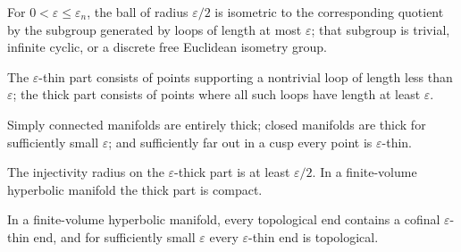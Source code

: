 \begin{theorem}
\label{thm:chow-iv-margulis-local}

For \(0<\varepsilon\le\varepsilon_n\), the ball of radius \(\varepsilon/2\) is
isometric to the corresponding quotient by the subgroup generated by loops of
length at most \(\varepsilon\); that subgroup is trivial, infinite cyclic, or
a discrete free Euclidean isometry group.
\end{theorem}

\begin{definition}
\label{def:chow-iv-thick-thin-parts}

The \(\varepsilon\)-thin part consists of points supporting a nontrivial loop
of length less than \(\varepsilon\); the thick part consists of points where
all such loops have length at least \(\varepsilon\).
\end{definition}

\begin{example}
\label{ex:chow-iv-thick-thin-examples}

Simply connected manifolds are entirely thick; closed manifolds are thick for
sufficiently small \(\varepsilon\); and sufficiently far out in a cusp every
point is \(\varepsilon\)-thin.
\end{example}

\begin{lemma}
\label{lem:chow-iv-thick-injectivity-radius}

The injectivity radius on the \(\varepsilon\)-thick part is at least
\(\varepsilon/2\).  In a finite-volume hyperbolic manifold the thick part is
compact.
\end{lemma}

\begin{lemma}
\label{lem:chow-iv-topological-ends-thin}

In a finite-volume hyperbolic manifold, every topological end contains a
cofinal \(\varepsilon\)-thin end, and for sufficiently small \(\varepsilon\)
every \(\varepsilon\)-thin end is topological.
\end{lemma}


